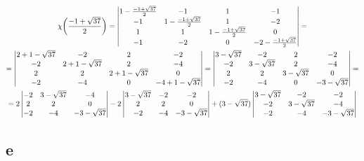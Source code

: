 \begin{multline*}
    \chi \bigg( \half[-1 + \sqrt{37}] \bigg) =
    \begin{vmatrix}
        1 - \half[-1 + \sqrt{37}] & -1 & 1 & -1 \\
        -1 & 1 - \half[-1 + \sqrt{37}] & 1 & -2 \\
        1 & 1 & 1 - \half[-1 + \sqrt{37}] & 0 \\
        -1 & -2 & 0 & -2 - \half[-1 + \sqrt{37}]
    \end{vmatrix} = \\
    =
    \begin{vmatrix}
        2 + 1 - \sqrt{37} & -2 & 2 & -2 \\
        -2 & 2 + 1 - \sqrt{37} & 2 & -4 \\
        2 & 2 & 2 + 1 - \sqrt{37} & 0 \\
        -2 & -4 & 0 & -4 + 1 - \sqrt{37}
    \end{vmatrix} =
    \begin{vmatrix}
        3 - \sqrt{37} & -2 & 2 & -2 \\
        -2 & 3 - \sqrt{37} & 2 & -4 \\
        2 & 2 & 3 - \sqrt{37} & 0 \\
        -2 & -4 & 0 & -3 - \sqrt{37}
    \end{vmatrix} = \\
    = 2
    \begin{vmatrix}
        -2 & 3 - \sqrt{37} & -4 \\
        2 & 2 & 0 \\
        -2 & -4 & -3 - \sqrt{37}
    \end{vmatrix} - 2
    \begin{vmatrix}
    	3 - \sqrt{37} & -2 & -2 \\
        2 & 2 & 0 \\
        -2 & -4 & -3 - \sqrt{37}
    \end{vmatrix} + (3 - \sqrt{37})
    \begin{vmatrix}
    	3 - \sqrt{37} & -2 & -2 \\
        -2 & 3 - \sqrt{37} & -4 \\
        -2 & -4 & -3 - \sqrt{37}
    \end{vmatrix}
\end{multline*}

\subsection{e}

